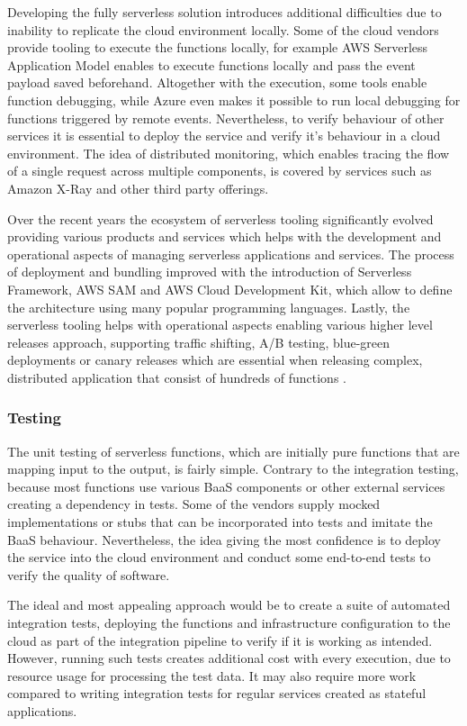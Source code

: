 Developing the fully serverless solution introduces additional difficulties due to inability to replicate the cloud environment locally. Some of the cloud vendors provide tooling to execute the functions locally, for example AWS Serverless Application Model enables to execute functions locally and pass the event payload saved beforehand. Altogether with the execution, some tools enable function debugging, while Azure even makes it possible to run local debugging for functions triggered by remote events. Nevertheless, to verify behaviour of other services it is essential to deploy the service and verify it's behaviour in a cloud environment. The idea of distributed monitoring, which enables tracing the flow of a single request across multiple components, is covered by services such as Amazon X-Ray and other third party offerings.

Over the recent years the ecosystem of serverless tooling significantly evolved providing various products and services which helps with the development and operational aspects of managing serverless applications and services. The process of deployment and bundling improved with the introduction of Serverless Framework, AWS SAM and AWS Cloud Development Kit, which allow to define the architecture using many popular programming languages. Lastly, the serverless tooling helps with operational aspects enabling various higher level releases approach, supporting traffic shifting, A/B testing, blue-green deployments or canary releases which are essential when releasing complex, distributed application that consist of hundreds of functions \cite{MartinFowlerServerless}.

\subsubsection*{Testing}

The unit testing of serverless functions, which are initially pure functions that are mapping input to the output, is fairly simple. Contrary to the integration testing, because most functions use various BaaS components or other external services creating a dependency in tests. Some of the vendors supply mocked implementations or stubs that can be  incorporated into tests and imitate the BaaS behaviour. Nevertheless, the idea giving the most confidence is to deploy the service into the cloud environment and conduct some end-to-end tests to verify the quality of software.

The ideal and most appealing approach would be to create a suite of automated integration tests, deploying the functions and infrastructure configuration to the cloud as part of the integration pipeline to verify if it is working as intended. However, running such tests creates additional cost with every execution, due to resource usage for processing the test data. It may also require more work compared to writing integration tests for regular services created as stateful applications. 

